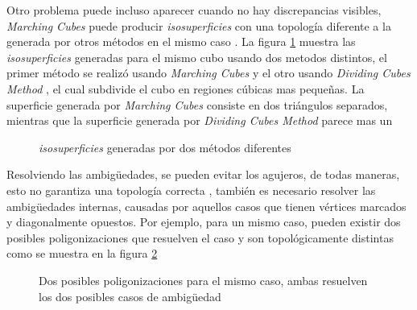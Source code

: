 Otro problema puede incluso aparecer cuando no hay discrepancias visibles, \emph{Marching Cubes} puede producir \emph{isosuperficies} con una topología diferente a la generada por otros métodos en el mismo caso \cite{Chernyaev95marchingcubes}. La figura \ref{f:estadoDelArte:Chernyaev95marchingcubes_2} muestra las \emph{isosuperficies} generadas para el mismo cubo usando dos metodos distintos, el primer método se realizó usando \emph{Marching Cubes} y el otro usando \emph{Dividing Cubes Method} \cite{Cline88twoalgorithms}, el cual subdivide el cubo en regiones cúbicas mas pequeñas. La superficie generada por \emph{Marching Cubes} consiste en dos triángulos separados, mientras que la superficie generada por \emph{Dividing Cubes Method} parece mas un 

\begin{figure}[tb]
\centering
\caption{\emph{isosuperficies} generadas por dos métodos diferentes \cite{Chernyaev95marchingcubes}}
\label{f:estadoDelArte:Chernyaev95marchingcubes_2}
\end{figure}

Resolviendo las ambigüedades, se pueden evitar los agujeros, de todas maneras, esto no garantiza una topología correcta \cite{Lewiner03efficientimplementation}, también es necesario resolver las ambigüedades internas, causadas por aquellos casos que tienen vértices marcados y diagonalmente opuestos. Por ejemplo, para un mismo caso, pueden existir dos posibles poligonizaciones que resuelven el caso y son topológicamente distintas como se muestra en la figura \ref{f:estadoDelArte:Lewiner03efficientimplementation_2}

\begin{figure}[!htb]
\centering
\caption{Dos posibles poligonizaciones para el mismo caso, ambas resuelven los dos posibles casos de ambigüedad \cite{Lewiner03efficientimplementation}}
\label{f:estadoDelArte:Lewiner03efficientimplementation_2}
\end{figure}

